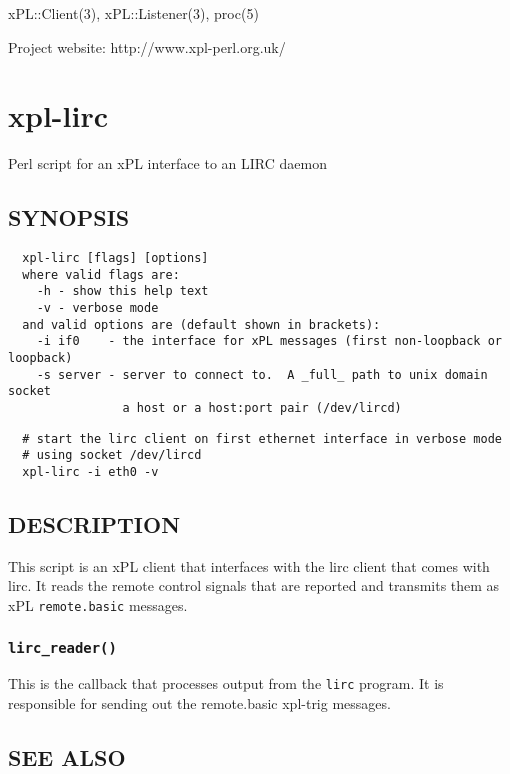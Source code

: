 xPL::Client(3), xPL::Listener(3), proc(5)



Project website: http://www.xpl-perl.org.uk/

\section{xpl-lirc\label{xpl-lirc}}


Perl script for an xPL interface to an LIRC daemon

\subsection*{SYNOPSIS\label{xpl-lirc_SYNOPSIS}}
\begin{verbatim}
  xpl-lirc [flags] [options]
  where valid flags are:
    -h - show this help text
    -v - verbose mode
  and valid options are (default shown in brackets):
    -i if0    - the interface for xPL messages (first non-loopback or loopback)
    -s server - server to connect to.  A _full_ path to unix domain socket
                a host or a host:port pair (/dev/lircd)
\end{verbatim}
\begin{verbatim}
  # start the lirc client on first ethernet interface in verbose mode
  # using socket /dev/lircd
  xpl-lirc -i eth0 -v
\end{verbatim}
\subsection*{DESCRIPTION\label{xpl-lirc_DESCRIPTION}}


This script is an xPL client that interfaces with the lirc client that
comes with lirc.  It reads the remote control signals that are reported
and transmits them as xPL \texttt{remote.basic} messages.

\subsubsection*{\texttt{lirc\_reader()}\label{xpl-lirc_lirc_reader_}}


This is the callback that processes output from the \texttt{lirc} program.
It is responsible for sending out the remote.basic xpl-trig messages.

\subsection*{SEE ALSO\label{xpl-lirc_SEE_ALSO}}


